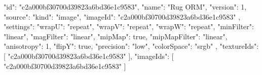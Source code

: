 {
  "id": "c2a000bf30700d39823a6bd36e1c9583",
  "name": "Rug ORM",
  "version": 1,
  "source": {
    "kind": "image",
    "imageId": "c2a000bf30700d39823a6bd36e1c9583"
  },
  "settings": {
    "wrapU": "repeat",
    "wrapV": "repeat",
    "wrapW": "repeat",
    "minFilter": "linear",
    "magFilter": "linear",
    "mipMap": true,
    "mipMapFilter": "linear",
    "anisotropy": 1,
    "flipY": true,
    "precision": "low",
    "colorSpace": "srgb"
  },
  "textureIds": [
    "c2a000bf30700d39823a6bd36e1c9583"
  ],
  "imageIds": [
    "c2a000bf30700d39823a6bd36e1c9583"
  ]
}
